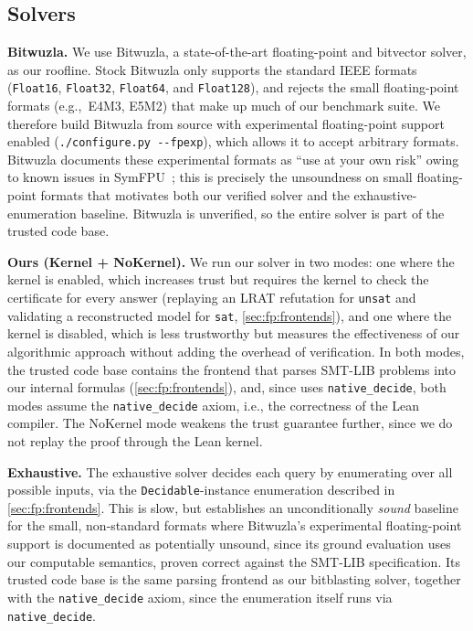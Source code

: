 \subsection{Solvers}
\noindent\textbf{Bitwuzla.}
We use Bitwuzla, a state-of-the-art floating-point and bitvector solver,
as our roofline.
Stock Bitwuzla only supports the standard IEEE formats
(\texttt{Float16}, \texttt{Float32}, \texttt{Float64}, and \texttt{Float128}),
and rejects the small floating-point formats (e.g.,~E4M3, E5M2) that make up much of our benchmark suite.
We therefore build Bitwuzla from source with experimental floating-point support enabled
(\texttt{./configure.py -{}-fpexp}), which allows it to accept arbitrary formats.
Bitwuzla documents these experimental formats as ``use at your own risk'' owing to known issues in SymFPU~\cite{symfpu};
this is precisely the unsoundness on small floating-point formats that motivates both our verified solver and the exhaustive-enumeration baseline.
Bitwuzla is unverified, so the entire solver is part of the trusted code base.

\noindent\textbf{Ours (Kernel + NoKernel).}
We run our solver in two modes: one where the kernel is enabled,
which increases trust but requires the kernel to check the certificate for every answer
(replaying an LRAT refutation for \texttt{unsat} and validating a reconstructed model for
\texttt{sat}, \cref{sec:fp:frontends}),
and one where the kernel is disabled,
which is less trustworthy but measures the effectiveness of our algorithmic approach
without adding the overhead of verification.
In both modes, the trusted code base contains the frontend that parses SMT-LIB problems into our internal formulas (\cref{sec:fp:frontends}),
and, since \bvdecide{} uses \texttt{native\_decide},
both modes assume the \texttt{native\_decide} axiom, i.e., the correctness of the Lean compiler.
The NoKernel mode weakens the trust guarantee further,
since we do not replay the proof through the Lean kernel.

\noindent\textbf{Exhaustive.}
The exhaustive solver decides each query by enumerating over all possible inputs,
via the \texttt{Decidable}-instance enumeration described in \cref{sec:fp:frontends}.
This is slow, but establishes an unconditionally \emph{sound} baseline for the small, non-standard
formats where Bitwuzla's experimental floating-point support is documented as potentially unsound,
since its ground evaluation uses our computable semantics, proven correct against the SMT-LIB specification.
Its trusted code base is the same parsing frontend as our bitblasting solver,
together with the \texttt{native\_decide} axiom, since the enumeration itself runs via \texttt{native\_decide}.

